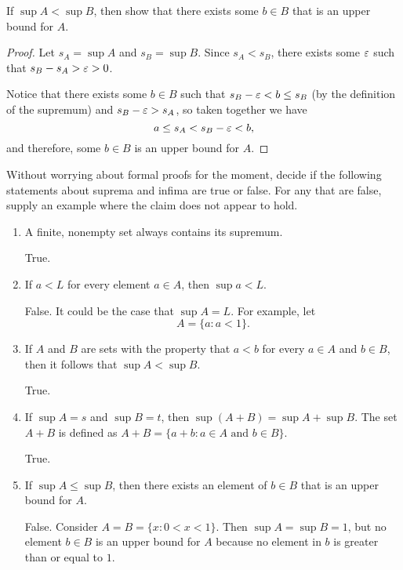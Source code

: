 \begin{problem} \label{prob:sup-upper-bound}
  If $\sup A < \sup B$, then show that there exists some $b \in B$ that is an upper bound for $A$.
\end{problem}

\begin{proof}
  Let $s_A = \sup A$ and $s_B = \sup B$. Since $s_A < s_B$, there exists some
  $\varepsilon$ such that $s_B - s_A > \varepsilon > 0$. 

  Notice that there exists some $b \in B$ such that $s_B - \varepsilon < b \leq s_B$
  (by the definition of the supremum) and $s_B - \varepsilon > s_A$, so taken together
  we have 
  \[
    a \leq s_A < s_B - \varepsilon < b,
  \]
  and therefore, some $b \in B$ is an upper bound for $A$.
\end{proof}

\begin{problem} \label{prob:sup-inf-claims}
  Without worrying about formal proofs for the moment, decide if the following
  statements about suprema and infima are true or false. For any that are false,
  supply an example where the claim does not appear to hold.

  \begin{enumerate}[label=(\alph*)]
    \item A finite, nonempty set always contains its supremum. 

      True.

    \item If $a < L$ for every element $a \in A$, then $\sup a < L$.

      False. It could be the case that $\sup A = L$. For example, let
      \[
        A = \{ a : a < 1 \}.
      \]

    \item If $A$ and $B$ are sets with the property that $a < b$ for every $a
      \in A$ and $b \in B$, then it follows that $\sup A < \sup B$.

      True.

    \item If $\sup A = s$ and $\sup B = t$, then $\sup (A + B) = \sup A + \sup B$.
      The set $A + B$ is defined as $A + B = \{a + b : a \in A \text{ and } b \in B\}$.

      True. 

    \item If $\sup A \leq \sup B$, then there exists an element of $b \in B$
      that is an upper bound for $A$. 

      False. Consider $A = B = \{ x : 0 < x < 1 \}$. Then $\sup A = \sup B = 1$,
      but no element $b \in B$ is an upper bound for $A$ because no element
      in $b$ is greater than or equal to $1$.

  \end{enumerate}

\end{problem}

